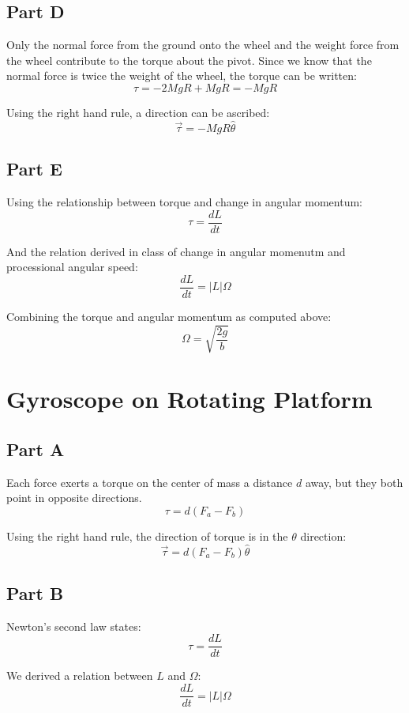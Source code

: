 \documentclass{article}
\begin{document}
\subsection*{ Part D }

Only the normal force from the ground onto the wheel and the weight force from
the wheel contribute to the torque about the pivot. Since we know that the
normal force is twice the weight of the wheel, the torque can be written:
$$ \tau = -2MgR + MgR = -MgR $$

Using the right hand rule, a direction can be ascribed:
$$ \vec{ \tau } = -MgR \hat{ \theta } $$

\subsection*{ Part E }

Using the relationship between torque and change in angular momentum:
$$ \tau = \frac{ dL }{ dt } $$

And the relation derived in class of change in angular momenutm and processional
angular speed:
$$ \frac{ dL }{ dt } = \vert L \vert \Omega $$

Combining the torque and angular momentum as computed above:
$$ \Omega = \sqrt{ \frac{ 2g }{ b } } $$

\section{ Gyroscope on Rotating Platform }

\subsection*{ Part A }

Each force exerts a torque on the center of mass a distance $d$ away, but they
both point in opposite directions.
$$ \tau = d( F_{a} - F_{b} ) $$

Using the right hand rule, the direction of torque is in the $\theta$ direction:
$$ \vec{ \tau } = d( F_{a} - F_{b} ) \hat{ \theta } $$

\subsection*{ Part B }

Newton's second law states:
$$ \tau = \frac{ dL }{ dt } $$

We derived a relation between $L$ and $\Omega$:
$$ \frac{ dL }{ dt } = \vert L \vert \Omega $$
\end{document}

